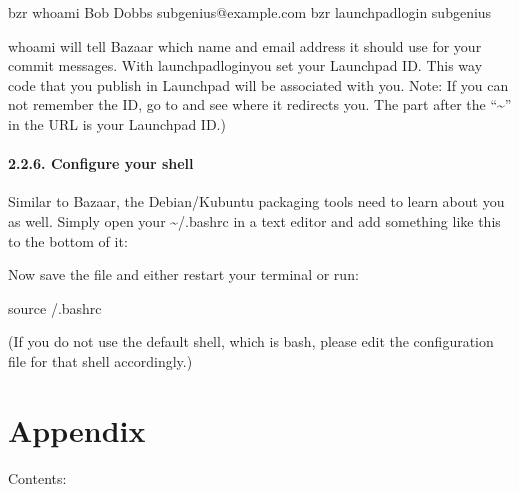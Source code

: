 \documentclass[letterpaper,10pt,english]{sphinxmanual}
\begin{document}
\begin{sphinxVerbatim}[commandchars=\\\{\}]
\PYGZdl{} bzr whoami \PYGZdq{}Bob Dobbs \PYGZlt{}subgenius@example.com\PYGZgt{}\PYGZdq{}
\PYGZdl{} bzr launchpad\PYGZhy{}login subgenius
\end{sphinxVerbatim}

\sphinxAtStartPar
whoami will tell Bazaar which name and email address it should use for your commit messages. With launchpad\sphinxhyphen{}loginyou set your Launchpad ID. This way code that you publish in Launchpad will be associated with you.
Note: If you can not remember the ID, go to  and see where it redirects you. The part after the “\textasciitilde{}” in the URL is your Launchpad ID.)


\subsubsection{2.2.6. Configure your shell}
\label{\detokenize{docs/packaging-guide/getting-started:configure-your-shell}}
\sphinxAtStartPar
Similar to Bazaar, the Debian/Kubuntu packaging tools need to learn about you as well. Simply open your \textasciitilde{}/.bashrc in a text editor and add something like this to the bottom of it:

\begin{sphinxVerbatim}[commandchars=\\\{\}]
 
 
\end{sphinxVerbatim}

\sphinxAtStartPar
Now save the file and either restart your terminal or run:

\begin{sphinxVerbatim}[commandchars=\\\{\}]
\PYGZdl{} source \PYGZti{}/.bashrc
\end{sphinxVerbatim}

\sphinxAtStartPar
(If you do not use the default shell, which is bash, please edit the configuration file for that shell accordingly.)


\chapter{Appendix}
\label{\detokenize{docs/appendix/appendix:appendix}}\label{\detokenize{docs/appendix/appendix::doc}}
\sphinxAtStartPar
Contents:
\end{document}
